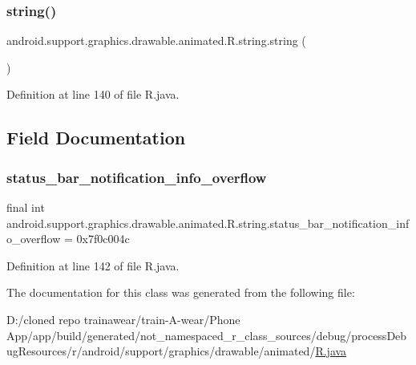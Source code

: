 \subsubsection{\texorpdfstring{string()}{string()}}
{\footnotesize\ttfamily android.\+support.\+graphics.\+drawable.\+animated.\+R.\+string.\+string (\begin{DoxyParamCaption}{ }\end{DoxyParamCaption})\hspace{0.3cm}{\ttfamily [private]}}



Definition at line 140 of file R.\+java.


\begin{DoxyCode}{0}

\end{DoxyCode}


\subsection{Field Documentation}
\mbox{\label{classandroid_1_1support_1_1graphics_1_1drawable_1_1animated_1_1_r_1_1string_adb1e336cab06d5a619196b54c531a8fe}} 
\subsubsection{\texorpdfstring{status\_bar\_notification\_info\_overflow}{status\_bar\_notification\_info\_overflow}}
{\footnotesize\ttfamily final int android.\+support.\+graphics.\+drawable.\+animated.\+R.\+string.\+status\+\_\+bar\+\_\+notification\+\_\+info\+\_\+overflow = 0x7f0c004c\hspace{0.3cm}{\ttfamily [static]}}



Definition at line 142 of file R.\+java.



The documentation for this class was generated from the following file\+:\begin{DoxyCompactItemize}
\item 
D\+:/cloned repo trainawear/train-\/\+A-\/wear/\+Phone App/app/build/generated/not\+\_\+namespaced\+\_\+r\+\_\+class\+\_\+sources/debug/process\+Debug\+Resources/r/android/support/graphics/drawable/animated/\mbox{\hyperlink{process_debug_resources_2r_2android_2support_2graphics_2drawable_2animated_2_r_8java}{R.\+java}}\end{DoxyCompactItemize}
